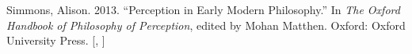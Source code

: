 \documentclass[
  12pt,
  a4paper,
  oneside]{scrbook}
\newlength{\cslhangindent}
\newlength{\cslentryspacingunit} %
\newenvironment{CSLReferences}[2] %
 {%
  \setlength{\parindent}{0pt}
  \ifodd #1
  \let\oldpar\par
  \def\par{\hangindent=\cslhangindent\oldpar}
  \fi
  \setlength{\parskip}{#2\cslentryspacingunit}
 }%
 {}
\begin{document}
\begin{CSLReferences}{1}{0}
\leavevmode{}%
Simmons, Alison. 2013. {``Perception in Early Modern Philosophy.''} In
\emph{The Oxford Handbook of Philosophy of Perception}, edited by Mohan
Matthen. Oxford: Oxford University Press.
{[},
\protect\hyperlink{cite_5}{\pageref{cite_5}}{]}

\end{CSLReferences}


\backmatter
\end{document}
